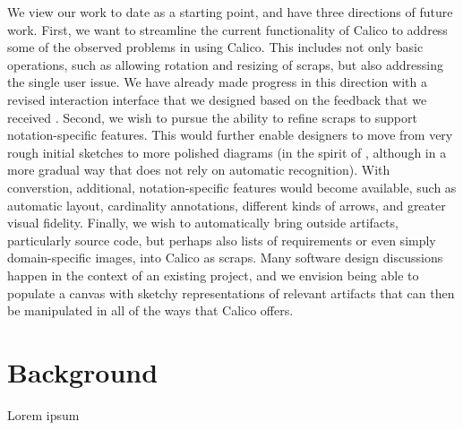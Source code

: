 We view our work to date as a starting point, and have three directions of future work. First, we want to streamline the current functionality of Calico to address some of the observed problems in using Calico. This includes not only basic operations, such as allowing rotation and resizing of scraps, but also addressing the single user issue. We have already made progress in this direction with a revised interaction interface that we designed based on the feedback that we received \citep{Mangano2}.  Second, we wish to pursue the ability to refine scraps to support notation-specific features.  This would further enable designers to move from very rough initial sketches to more polished diagrams (in the spirit of \citep{Plimmer2}, although in a more gradual way that does not rely on automatic recognition). With converstion, additional, notation-specific features would become available, such as automatic layout, cardinality annotations, different kinds of arrows, and greater visual fidelity. Finally, we wish to automatically bring outside artifacts, particularly source code, but perhaps also lists of requirements or even simply domain-specific images, into Calico as scraps. Many software design discussions happen in the context of an existing project, and we envision being able to populate a canvas with sketchy representations of relevant artifacts that can then be manipulated in all of the ways that Calico offers.


\section{Background}

Lorem ipsum


